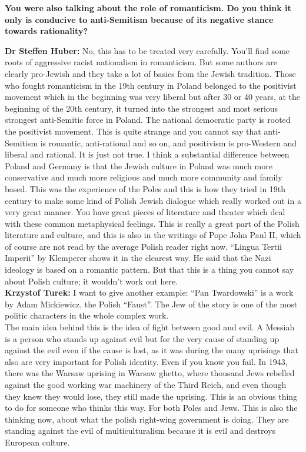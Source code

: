 \textbf{You were also talking about the role of romanticism. Do you think it only is conducive to anti-Semitism because of its negative stance towards rationality?} 

\textbf{Dr Steffen Huber:} No, this has to be treated very carefully. You’ll find some roots of aggressive racist nationalism in romanticism. But some authors are clearly pro-Jewish and they take a lot of basics from the Jewish tradition. Those who fought romanticism in the 19th century in Poland belonged to the positivist movement which in the beginning was very liberal but after 30 or 40 years, at the beginning of the 20th century, it turned into the strongest and most serious strongest anti-Semitic force in Poland. The national democratic party is rooted the positivist movement. This is quite strange and you cannot say that anti-Semitism is romantic, anti-rational and so on, and positivism is pro-Western and liberal and rational. It is just not true. I think a substantial difference between Poland and Germany is that the Jewish culture in Poland was much more conservative and much more religious and much more community and family based. This was the experience of the Poles and this is how they tried in 19th century to make some kind of Polish Jewish dialogue which really worked out in a very great manner.  You have great pieces of literature and theater which deal with these common metaphysical feelings. This is really a great part of the Polish literature and culture, and this is also in the writings of Pope John Paul II, which of course are not read by the average Polish reader right now. ``Lingua Tertii Imperii'' by Klemperer shows it in the clearest way. He said that the Nazi ideology is based on a romantic pattern. But that this is a thing you cannot say about Polish culture; it wouldn't work out here.\\ 
\textbf{Krzystof Turek:} I want to give another example: ``Pan Twardowski'' is a work by Adam Mickiewicz, the Polish ``Faust''. The Jew of the story is one of the most politic characters in the whole complex work.\\
The main idea behind this is the idea of fight between good and evil. A Messiah is a person who stands up against evil but for the very cause of standing up against the evil even if the cause is lost, as it was during the many uprisings that also are very important for Polish identity. Even if you know you fail. In 1943, there was the Warsaw uprising in Warsaw ghetto, where thousand Jews rebelled against the good working war machinery of the Third Reich, and even though they knew they would lose, they still made the uprising. This is an obvious thing to do for someone who thinks this way. For both Poles and Jews. This is also the thinking now, about what the polish right-wing government is doing. They are standing against the evil of multiculturalism because it is evil and destroys European culture.\\ 
